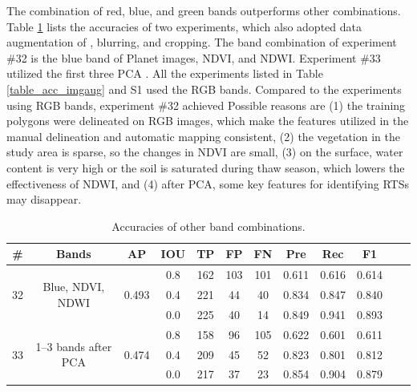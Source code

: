 \documentclass[authoryear,preprint,review,12pt]{elsarticle}
\begin{document}
The combination of red, blue, and green bands outperforms other combinations.
Table \ref{table_acc_otherbands} lists the accuracies of two experiments, which also adopted data augmentation of , blurring, and cropping. The band combination of experiment \#32 is the blue band of Planet images, NDVI, and NDWI. Experiment \#33 utilized the first three PCA . All the experiments listed in Table \ref{table_acc_imgaug} and S1 used the RGB bands. Compared to the experiments using RGB bands, experiment \#32  achieved   Possible reasons are (1) the training polygons were delineated on RGB images, which make the features utilized in the manual delineation and automatic mapping consistent, (2) the vegetation in the study area is sparse, so the changes in NDVI are small, (3) on the surface, water content is very high or the soil is saturated during thaw season, which lowers the effectiveness of NDWI, and (4) after PCA, some key features for identifying RTSs may disappear. 

\begin{table}[ht]
\footnotesize
\caption{Accuracies of other band combinations.}
\label{table_acc_otherbands}
\begin{tabular}{c c c c  c ccc c c c c}
\toprule
\textbf{\#}&\textbf{Bands}&\textbf{AP}&\textbf{IOU}&\textbf{TP}&\textbf{FP}&\textbf{FN}&\textbf{Pre}&\textbf{Rec}&\textbf{F1}\\
\midrule

\multirow{3}{*}{32} &  \multirow{3}{3cm}{Blue, NDVI, NDWI} & \multirow{3}{*}{0.493}  &0.8&162   & 103   & 101   & 0.611  & 0.616  & 0.614   \\
 &  &  &0.4&221   & 44    & 40    & 0.834  & 0.847  & 0.840 \\
 &  &  &0.0&225   & 40    & 14    & 0.849  & 0.941  & 0.893   \\
 
\midrule

\multirow{3}{*}{33} &  \multirow{3}{3cm}{1--3 bands after PCA} & \multirow{3}{*}{0.474} &0.8& 158   & 96    & 105   & 0.622  & 0.601  & 0.611  \\
 &  &  &0.4& 209   & 45    & 52    & 0.823  & 0.801  & 0.812  \\
 &  & &0.0& 217   & 37    & 23    & 0.854  & 0.904  & 0.879  \\

\bottomrule
\end{tabular}

\end{table}
\end{document}
